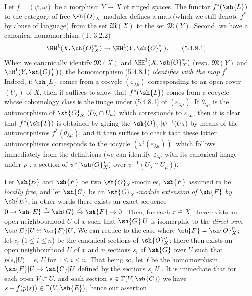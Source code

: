 \begin{env}[5.4.8]
\label{0.5.4.8}
Let $f=(\psi,\omega)$ be a morphism $Y\to X$ of ringed spaces.
The functor $f^*(\sh{L})$ to the category of free $\sh{O}_X$-modules defines a map (which we still denote $f^*$ by abuse of language) from the set $\mathfrak{M}(X)$ to the set $\mathfrak{M}(Y)$.
Second, we have a canonical homomorphism (T, 3.2.2)
\[
  \HH^1(X,\sh{O}_X^*)\to\HH^1(Y,\sh{O}_Y^*).
  \tag{5.4.8.1}\label{0.5.4.8.1}
\]
When we canonically identify  $\mathfrak{M}(X)$ and $\HH^1(X,\sh{O}_X^*)$ (resp. $\mathfrak{M}(Y)$ and $\HH^1(Y,\sh{O}_Y^*)$), the homomorphism (\hyperref[0.5.4.8.1]{5.4.8.1}) \emph{identifies with the map $f^*$}.
Indeed, if $\sh{L}$ comes from a cocycle $(\varepsilon_{\lambda\mu})$ corresponding to an open cover $(U_\lambda)$ of $X$, then it suffices to show that $f^*(\sh{L})$ comes from a cocycle whose cohomology class is the image under (\hyperref[0.5.4.8.1]{5.4.8.1}) of $(\varepsilon_{\lambda\mu})$.
If $\theta_{\lambda\mu}$ is the automorphism of $\sh{O}_X|(U_\lambda\cap U_\mu)$ which corresponds to $\varepsilon_{\lambda\mu}$, then it is clear that $f^*(\sh{L})$ is obtained by gluing the $\sh{O}_Y|\psi^{-1}(U_\lambda)$ by means of the automorphisms $f^*(\theta_{\lambda\mu})$, and it then suffices to check that these latter automorphisms corresponds to the cocycle $(\omega^\sharp(\varepsilon_{\lambda\mu}))$, which follows immediately from the definitions (we can identify $\varepsilon_{\lambda\mu}$ with its canonical image under $\rho$ , a section of $\psi^*(\sh{O}_X^*)$ over $\psi^{-1}(U_\lambda\cap U_\mu)$).
\end{env}

\begin{env}[5.4.9]
\label{0.5.4.9}
Let $\sh{E}$ and $\sh{F}$ be two $\sh{O}_X$-modules, $\sh{F}$ assumed to be \emph{locally free}, and let $\sh{G}$ be an \emph{$\sh{O}_X$-module extension of $\sh{F}$ by $\sh{E}$}, in other words there exists an exact sequence $0\to\sh{E}\xrightarrow{i}\sh{G}\xrightarrow{p}\sh{F}\to 0$.
Then, for each $x\in X$, there exists an open neighbourhood $U$ of $x$ such that $\sh{G}|U$ is isomorphic to the \emph{direct sum $\sh{E}|U\oplus\sh{F}|U$}.
We can reduce to the case where $\sh{F}=\sh{O}_X^n$; let $e_i$ ($1\leq i\leq n$) be the canonical sections  of $\sh{O}_X^n$; there then exists an open neighbourhood $U$ of $x$ and $n$ sections $s_i$ of $\sh{G}$ over $U$ such that $p(s_i|U)=e_i|U$ for $1\leq i\leq n$.
That being so, let $f$ be the homomorphism $\sh{F}|U\to\sh{G}|U$ defined by the sections $s_i|U$ .
It is immediate that for each open $V\subset U$, and each section $s\in\Gamma(V,\sh{G})$ we have $s-f(p(s))\in\Gamma(V,\sh{E})$, hence our assertion.
\end{env}

